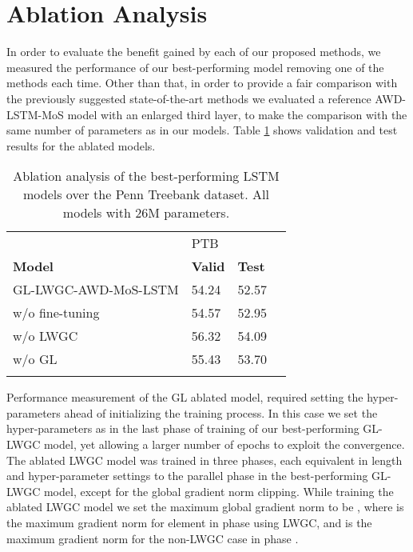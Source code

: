 \documentclass{article}
\begin{document}
\section{Ablation Analysis}
In order to evaluate the benefit gained by each of our proposed methods, we measured the performance of our best-performing model removing one of the methods each time. Other than that, in order to provide a fair comparison with the previously suggested state-of-the-art methods \cite{mos} we evaluated a reference AWD-LSTM-MoS model with an enlarged third layer, to make the comparison with the same number of parameters as in our models. Table \ref{ablation_table} shows validation and test results for the ablated models.


\begin{table}[!ht] 
  \label{table:ablation}
  \centering
  \begin{tabular}{llll}
  \toprule
    & \quad \quad \quad PTB &  \\
    \textbf{Model} 	& \textbf{Valid} & \textbf{Test} \\
    \midrule
    \midrule
    GL-LWGC-AWD-MoS-LSTM    &  54.24     & 52.57 \\
    \toprule
    w/o fine-tuning            &  54.57    & 52.95 \\
    w/o LWGC                  &  56.32    & 54.09 \\
    w/o GL                    &  55.43    & 53.70 \\

    \bottomrule
    \hfill
  \end{tabular}
  \caption{Ablation analysis of the best-performing LSTM models over the Penn Treebank dataset. All models with 26M parameters.}
  \label{ablation_table}
\end{table}

Performance measurement of the GL ablated model, required setting the hyper-parameters ahead of initializing the training process. In this case we set the hyper-parameters as in the last phase of training of our best-performing GL-LWGC model, yet allowing a larger number of epochs to exploit the convergence. The ablated LWGC model was trained in three phases, each equivalent in length and hyper-parameter settings to the parallel phase in the best-performing GL-LWGC model, except for the global gradient norm clipping. While training the ablated LWGC model we set the maximum global gradient norm to be 
   ,  
where  is the maximum gradient norm for element  in phase  using LWGC, and  is the maximum gradient norm for the non-LWGC case in phase .
\end{document}
